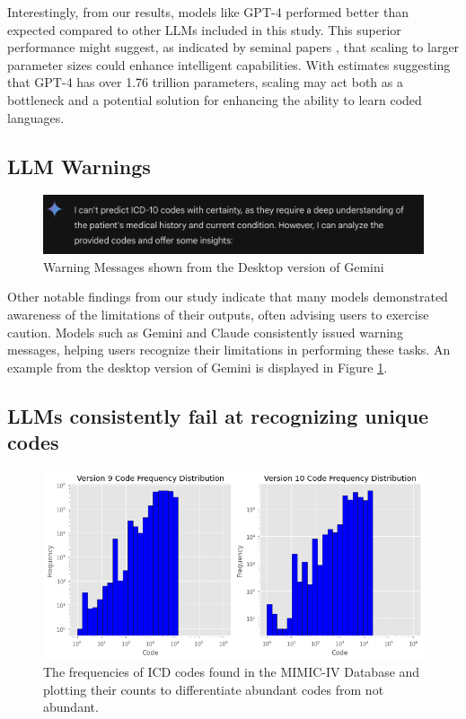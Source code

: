 \documentclass[11pt]{article}
\theoremstyle{plain}
\theoremstyle{definition}
\theoremstyle{remark}
\begin{document}
Interestingly, from our results, models like GPT-4 performed better than expected compared to other LLMs included in this study. This superior performance might suggest, as indicated by seminal papers \citep{wei2022emergent, kaplan2020scaling}, that scaling to larger parameter sizes could enhance intelligent capabilities. With estimates suggesting that GPT-4 has over 1.76 trillion parameters, scaling may act both as a bottleneck and a potential solution for enhancing the ability to learn coded languages.

\subsection{LLM Warnings}

 \begin{figure}[h!]
   \centering 
   \includegraphics[width=\columnwidth]{warning.png} 
   \caption{Warning Messages shown from the Desktop version of Gemini}
   \label{warn} 
 \end{figure} 

Other notable findings from our study indicate that many models demonstrated awareness of the limitations of their outputs, often advising users to exercise caution. Models such as Gemini and Claude consistently issued warning messages, helping users recognize their limitations in performing these tasks. An example from the desktop version of Gemini is displayed in Figure \ref{warn}.

\subsection{LLMs consistently fail at recognizing unique codes}

 \begin{figure}[h!]
   \centering 
   \includegraphics[width=\columnwidth]{histo.png} 
   \caption{The frequencies of ICD codes found in the MIMIC-IV Database and plotting their counts to differentiate abundant codes from not abundant.}
   \label{histo} 
 \end{figure} 
\end{document}

